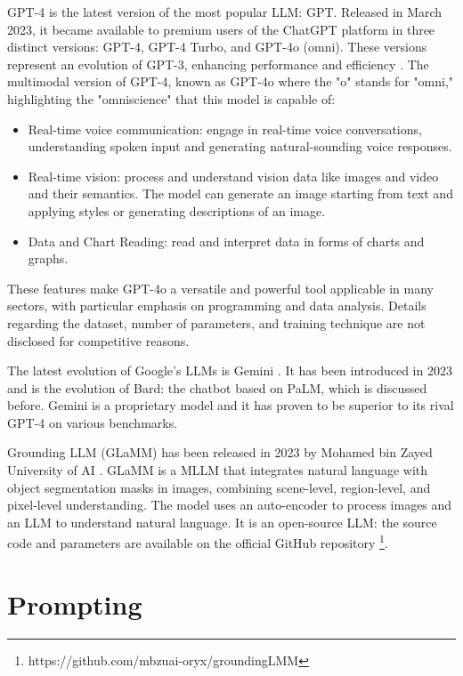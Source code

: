 GPT-4 is the latest version of the most popular LLM: GPT.
Released in March 2023, it became available to premium users of the ChatGPT platform in three distinct versions: GPT-4, GPT-4 Turbo, and GPT-4o (omni).
These versions represent an evolution of GPT-3, enhancing performance and efficiency \cite{insights_gpt4}.
The multimodal version of GPT-4, known as GPT-4o where the "o" stands for "omni," highlighting the "omniscience" that this model is capable of:
\begin{itemize}
    \item Real-time voice communication: engage in real-time voice conversations, understanding spoken input and generating natural-sounding voice responses.
    
    \item Real-time vision: process and understand vision data like images and video and their semantics. The model can generate an image starting from text and applying styles or generating descriptions of an image.
    
    \item Data and Chart Reading: read and interpret data in forms of charts and graphs.
\end{itemize}
These features make GPT-4o a versatile and powerful tool applicable in many sectors, with particular emphasis on programming and data analysis.
Details regarding the dataset, number of parameters, and training technique are not disclosed for competitive reasons.

The latest evolution of Google's LLMs is Gemini \cite{gemini_introduction}.
It has been introduced in 2023 and is the evolution of Bard: the chatbot based on PaLM, which is discussed before.
Gemini is a proprietary model and it has proven to be superior to its rival GPT-4 on various benchmarks.

Grounding LLM (GLaMM) has been released in 2023 by Mohamed bin Zayed University of AI \cite{rasheed2024glamm}.
GLaMM is a MLLM that integrates natural language with object segmentation masks in images, combining scene-level, region-level, and pixel-level understanding.
The model uses an auto-encoder to process images and an LLM to understand natural language.
It is an open-source LLM: the source code and parameters are available on the official GitHub repository \footnote{https://github.com/mbzuai-oryx/groundingLMM}.

\section{Prompting}
\label{section:2_4_prompt_engineering}


